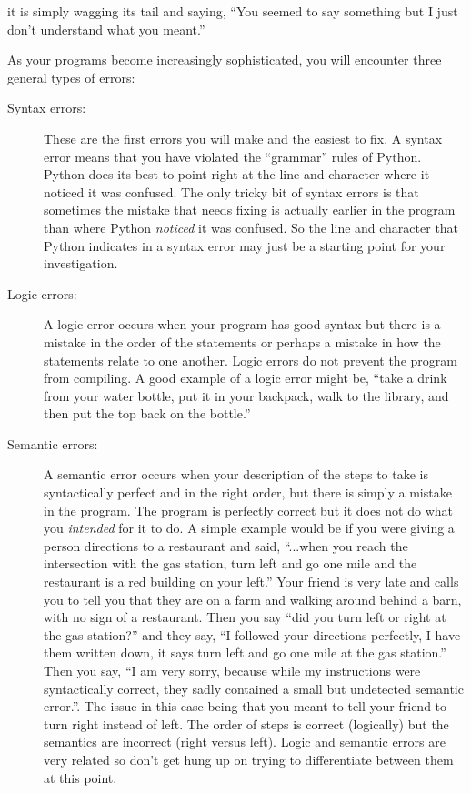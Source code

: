 it is simply wagging
its tail and saying, ``You seemed to say something but I just don't
understand what you meant.''

As your programs become increasingly sophisticated, you will encounter three 
general types of errors:

\begin{description}

\item[Syntax errors:] These are the first errors you will make and the easiest
to fix.  A syntax error means that you have violated the ``grammar'' rules of Python.
Python does its best to point right at the line and character where 
it noticed it was confused.  The only tricky bit of syntax errors is that sometimes
the mistake that needs fixing is actually earlier in the program than where Python
{\em noticed} it was confused.  So the line and character that Python indicates in 
a syntax error may just be a starting point for your investigation.

\item[Logic errors:] A logic error occurs when your program has good syntax but there is a mistake 
in the order of the statements or perhaps a mistake in how the statements relate to one another. Logic errors do not prevent the program from compiling.
A good example of a logic error might be, ``take a drink from your water bottle, put it 
in your backpack, walk to the library, and then put the top back on the bottle.''

\item[Semantic errors:] A semantic error occurs when your description of the steps to take 
is syntactically perfect and in the right order, but there is simply a mistake in 
the program.  The program is perfectly correct but it does not do what
you {\em intended} for it to do. A simple example would
be if you were giving a person directions to a restaurant and said, ``...when you reach
the intersection with the gas station, turn left and go one mile and the restaurant
is a red building on your left.''  Your friend is very late and calls you to tell you that
they are on a farm and walking around behind a barn, with no sign of a restaurant.  
Then you say ``did you turn left or right at the gas station?'' and 
they say, ``I followed your directions perfectly, I have 
them written down, it says turn left and go one mile at the gas station.''  Then you say,
``I am very sorry, because while my instructions were syntactically correct, they 
sadly contained a small but undetected semantic error.''.  The issue in this case being that you meant to tell your friend to turn right instead of left. The order of steps is correct (logically) but the semantics are incorrect (right versus left). Logic and semantic errors are very related so don't get hung up on trying to differentiate between them at this point.

\end{description}

